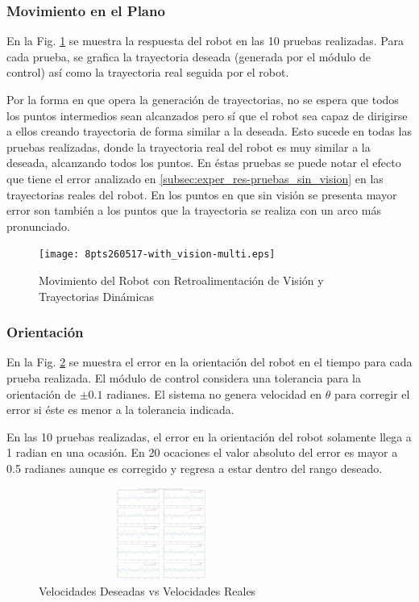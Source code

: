 \documentclass[twocolumn,10pt]{amrob}
\begin{document}
\subsubsection*{Movimiento en el Plano}
En la Fig. \ref{fig:8pts_vision_multi} se muestra la respuesta del robot en las 10 pruebas realizadas. Para cada prueba, se grafica la trayectoria deseada (generada por el módulo de control) así como la trayectoria real seguida por el robot. 
\par
Por la forma en que opera la generación de trayectorias, no se espera que todos los puntos intermedios sean alcanzados pero sí que el robot sea capaz de dirigirse a ellos creando trayectoria de forma similar a la deseada. Esto sucede en todas las pruebas realizadas, donde la trayectoria real del robot es muy similar a la deseada, alcanzando todos los puntos. En éstas pruebas se puede notar el efecto que tiene el error analizado en \ref{subsec:exper_res-pruebas_sin_vision} en las trayectorias reales del robot. En los puntos en que sin visión se presenta mayor error son también a los puntos que la trayectoria se realiza con un arco más pronunciado. 
\par
\begin{figure}
  \centering
    \texttt{[image: 8pts260517-with\_vision-multi.eps]}
  \caption{Movimiento del Robot con Retroalimentación de Visión y Trayectorias Dinámicas}
  \label{fig:8pts_vision_multi}
\end{figure}
\subsubsection*{Orientación}
En la Fig. \ref{fig:orient_vision_multi} se muestra el error en la orientación del robot en el tiempo para cada prueba realizada. El módulo de control considera una tolerancia para la orientación de $\pm 0.1$ radianes. El sistema no genera velocidad en $\theta$ para corregir el error si éste es menor a la tolerancia indicada. 
\par
En las 10 pruebas realizadas, el error en la orientación del robot solamente llega a 1 radian en una ocasión. En 20 ocaciones el valor absoluto del error es mayor a 0.5 radianes aunque es corregido y regresa a estar dentro del rango deseado. 
\par
\begin{figure}
  \centering
    \includegraphics[height=3cm,width=8cm]{8pts260517-with_vision-multi-theta.eps}
  \caption{Velocidades Deseadas vs Velocidades Reales}
  \label{fig:orient_vision_multi}
\end{figure}
\end{document}
